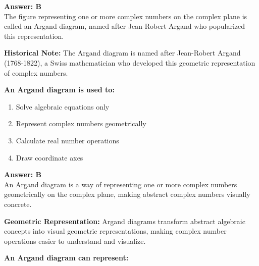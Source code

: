 \documentclass[12pt,a4paper]{article}
\begin{document}
\begin{answerstyle}
\textbf{Answer: B} \\
The figure representing one or more complex numbers on the complex plane is called an Argand diagram, named after Jean-Robert Argand who popularized this representation.
\end{answerstyle}

\begin{conceptbox}
\textbf{Historical Note:} The Argand diagram is named after Jean-Robert Argand (1768-1822), a Swiss mathematician who developed this geometric representation of complex numbers.
\end{conceptbox}

\newpage
\begin{questiontitle}[MCQ 82]
\textbf{An Argand diagram is used to:}
\end{questiontitle}

\begin{partbox}[Options]
\begin{enumerate}[label=\Alph*.]
    \item Solve algebraic equations only
    \item Represent complex numbers geometrically
    \item Calculate real number operations
    \item Draw coordinate axes
\end{enumerate}
\end{partbox}

\begin{answerstyle}
\textbf{Answer: B} \\
An Argand diagram is a way of representing one or more complex numbers geometrically on the complex plane, making abstract complex numbers visually concrete.
\end{answerstyle}

\begin{conceptbox}
\textbf{Geometric Representation:} Argand diagrams transform abstract algebraic concepts into visual geometric representations, making complex number operations easier to understand and visualize.
\end{conceptbox}

\newpage
\begin{questiontitle}[MCQ 83]
\textbf{An Argand diagram can represent:}
\end{questiontitle}
\end{document}
